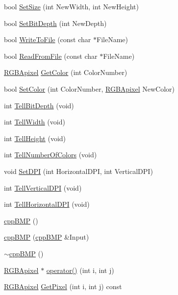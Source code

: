 \begin{CompactItemize}
\item 
bool \hyperlink{classcpp_b_m_p_9a6372827cbeb056c76f418bf764455d}{SetSize} (int NewWidth, int NewHeight)
\item 
bool \hyperlink{classcpp_b_m_p_4929652b47f073d3519b07fc05ed9eab}{SetBitDepth} (int NewDepth)
\item 
bool \hyperlink{classcpp_b_m_p_bee4a161c6d3ad3d627b70b62735259d}{WriteToFile} (const char $\ast$FileName)
\item 
bool \hyperlink{classcpp_b_m_p_b6b3269e3dc09cc5a9650578d5f5aa45}{ReadFromFile} (const char $\ast$FileName)
\item 
\hyperlink{struct_r_g_b_apixel}{RGBApixel} \hyperlink{classcpp_b_m_p_fa347d92080c6aa4870eb4b076d1aeba}{GetColor} (int ColorNumber)
\item 
bool \hyperlink{classcpp_b_m_p_954ee0b08e8b0e9455fe5c4a9e7a7181}{SetColor} (int ColorNumber, \hyperlink{struct_r_g_b_apixel}{RGBApixel} NewColor)
\item 
int \hyperlink{classcpp_b_m_p_95cf17f997cf74cbfaf889572bf7d751}{TellBitDepth} (void)
\item 
int \hyperlink{classcpp_b_m_p_539ec9582a0ebd2853d168eae6bfc68f}{TellWidth} (void)
\item 
int \hyperlink{classcpp_b_m_p_8dd563361efe9adc4bbe8ac88681811b}{TellHeight} (void)
\item 
int \hyperlink{classcpp_b_m_p_aef114087d702d456ef994bb64535e6e}{TellNumberOfColors} (void)
\item 
void \hyperlink{classcpp_b_m_p_96505f0e4666bd19d0c60e8eed948158}{SetDPI} (int HorizontalDPI, int VerticalDPI)
\item 
int \hyperlink{classcpp_b_m_p_809856c4aae1027fa37a7c3dd94d06c9}{TellVerticalDPI} (void)
\item 
int \hyperlink{classcpp_b_m_p_b0d8279d21b6890e9f7664bc46d4ff64}{TellHorizontalDPI} (void)
\item 
\hyperlink{classcpp_b_m_p_dd999f78c5b629a718c9ff82dca1b64a}{cppBMP} ()
\item 
\hyperlink{classcpp_b_m_p_97909a5d65342669eb673dc264600058}{cppBMP} (\hyperlink{classcpp_b_m_p}{cppBMP} \&Input)
\item 
\hyperlink{classcpp_b_m_p_ea62579b6a8a25449e108121de524019}{$\sim$cppBMP} ()
\item 
\hyperlink{struct_r_g_b_apixel}{RGBApixel} $\ast$ \hyperlink{classcpp_b_m_p_02a494f74cfc7d319e6ea9c1ab70c672}{operator()} (int i, int j)
\item 
\hyperlink{struct_r_g_b_apixel}{RGBApixel} \hyperlink{classcpp_b_m_p_230d6694feababb803a9b4cdd4885d4d}{GetPixel} (int i, int j) const 

\end{CompactItemize}
